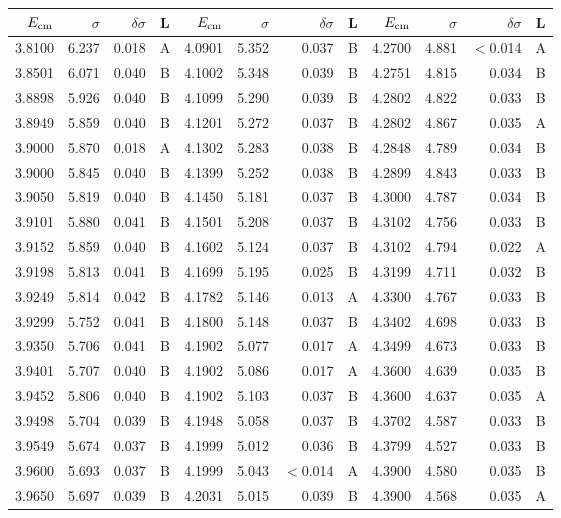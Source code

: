 \begin{tabular}{rrrc|rrrc|rrrc}
\toprule
$E_{\rm cm}$ & $\sigma$ & $\delta\sigma$ & L & $E_{\rm cm}$ & $\sigma$ & $\delta\sigma$ & L & $E_{\rm cm}$ & $\sigma$ & $\delta\sigma$ & L \\
\midrule
3.8100 & 6.237 & 0.018 & A & 4.0901 & 5.352 & 0.037 & B & 4.2700 & 4.881 & $<$0.014 & A \\
3.8501 & 6.071 & 0.040 & B & 4.1002 & 5.348 & 0.039 & B & 4.2751 & 4.815 & 0.034 & B \\
3.8898 & 5.926 & 0.040 & B & 4.1099 & 5.290 & 0.039 & B & 4.2802 & 4.822 & 0.033 & B \\
3.8949 & 5.859 & 0.040 & B & 4.1201 & 5.272 & 0.037 & B & 4.2802 & 4.867 & 0.035 & A \\
3.9000 & 5.870 & 0.018 & A & 4.1302 & 5.283 & 0.038 & B & 4.2848 & 4.789 & 0.034 & B \\
3.9000 & 5.845 & 0.040 & B & 4.1399 & 5.252 & 0.038 & B & 4.2899 & 4.843 & 0.033 & B \\
3.9050 & 5.819 & 0.040 & B & 4.1450 & 5.181 & 0.037 & B & 4.3000 & 4.787 & 0.034 & B \\
3.9101 & 5.880 & 0.041 & B & 4.1501 & 5.208 & 0.037 & B & 4.3102 & 4.756 & 0.033 & B \\
3.9152 & 5.859 & 0.040 & B & 4.1602 & 5.124 & 0.037 & B & 4.3102 & 4.794 & 0.022 & A \\
3.9198 & 5.813 & 0.041 & B & 4.1699 & 5.195 & 0.025 & B & 4.3199 & 4.711 & 0.032 & B \\
3.9249 & 5.814 & 0.042 & B & 4.1782 & 5.146 & 0.013 & A & 4.3300 & 4.767 & 0.033 & B \\
3.9299 & 5.752 & 0.041 & B & 4.1800 & 5.148 & 0.037 & B & 4.3402 & 4.698 & 0.033 & B \\
3.9350 & 5.706 & 0.041 & B & 4.1902 & 5.077 & 0.017 & A & 4.3499 & 4.673 & 0.033 & B \\
3.9401 & 5.707 & 0.040 & B & 4.1902 & 5.086 & 0.017 & A & 4.3600 & 4.639 & 0.035 & B \\
3.9452 & 5.806 & 0.040 & B & 4.1902 & 5.103 & 0.037 & B & 4.3600 & 4.637 & 0.035 & A \\
3.9498 & 5.704 & 0.039 & B & 4.1948 & 5.058 & 0.037 & B & 4.3702 & 4.587 & 0.033 & B \\
3.9549 & 5.674 & 0.037 & B & 4.1999 & 5.012 & 0.036 & B & 4.3799 & 4.527 & 0.033 & B \\
3.9600 & 5.693 & 0.037 & B & 4.1999 & 5.043 & $<$0.014 & A & 4.3900 & 4.580 & 0.035 & B \\
3.9650 & 5.697 & 0.039 & B & 4.2031 & 5.015 & 0.039 & B & 4.3900 & 4.568 & 0.035 & A \\

\end{tabular}
